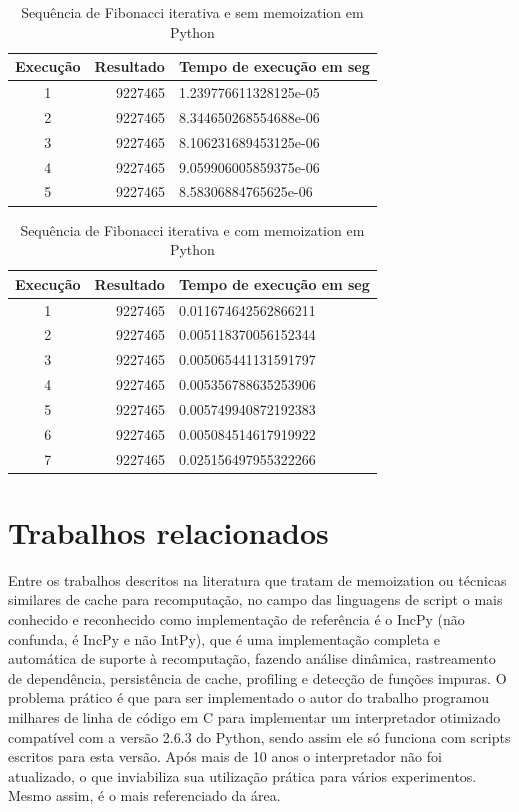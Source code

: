 \documentclass[sigconf]{acmart}
\begin{document}
\begin{table}[H]
  \caption{Sequência de Fibonacci iterativa e sem memoization em Python}
  \label{tab:fibiscache}
  \begin{tabular}{crl}
    \toprule
    Execução & Resultado & Tempo de execução em seg\\
    \midrule
    1 & 9227465 & 1.239776611328125e-05\\
    2 & 9227465 & 8.344650268554688e-06\\
    3 & 9227465 & 8.106231689453125e-06\\
    4 & 9227465 & 9.059906005859375e-06\\
    5 & 9227465 & 8.58306884765625e-06\\
  \bottomrule
\end{tabular}
\end{table}

\begin{table}[H]
  \caption{Sequência de Fibonacci iterativa e com memoization em Python}
  \label{tab:fibiccache}
  \begin{tabular}{crl}
    \toprule
    Execução & Resultado & Tempo de execução em seg\\
    \midrule
    1 & 9227465 & 0.011674642562866211\\
    2 & 9227465 & 0.005118370056152344\\
    3 & 9227465 & 0.005065441131591797\\
    4 & 9227465 & 0.005356788635253906\\
    5 & 9227465 & 0.005749940872192383\\
    6 & 9227465 & 0.005084514617919922\\
    7 & 9227465 & 0.025156497955322266\\
  \bottomrule
\end{tabular}
\end{table}

\section{Trabalhos relacionados}
Entre os trabalhos descritos na literatura que tratam de memoization ou técnicas similares de cache para recomputação, no campo das linguagens de script o mais conhecido e reconhecido como implementação de referência é o IncPy \cite{guo2011using}(não confunda, é IncPy e não IntPy), que é uma implementação completa e automática de suporte à recomputação, fazendo análise dinâmica, rastreamento de dependência, persistência de cache, profiling e detecção de funções impuras. O problema prático é que para ser implementado o autor do trabalho programou milhares de linha de código em C para implementar um interpretador otimizado compatível com a versão 2.6.3 do Python, sendo assim ele só funciona com scripts escritos para esta versão. Após mais de 10 anos o interpretador não foi atualizado, o que inviabiliza sua utilização prática para vários experimentos. Mesmo assim, é o mais referenciado da área.
\end{document}
